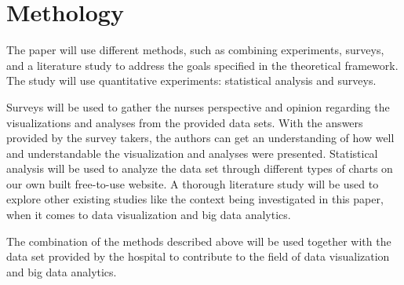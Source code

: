 \section{Methology}

The paper will use different methods, such as combining experiments, surveys, and a literature study to address the goals specified in the theoretical framework. The study will use quantitative experiments: statistical analysis and surveys.

Surveys will be used to gather the nurses perspective and opinion regarding the visualizations and analyses from the provided data sets. With the answers provided by the survey takers, the authors can get an understanding of how well and understandable the visualization and analyses were presented. Statistical analysis will be used to analyze the data set through different types of charts on our own built free-to-use website. A thorough literature study will be used to explore other existing studies like the context being investigated in this paper, when it comes to data visualization and big data analytics.

The combination of the methods described above will be used together with the data set provided by the hospital to contribute to the field of data visualization and big data analytics.



